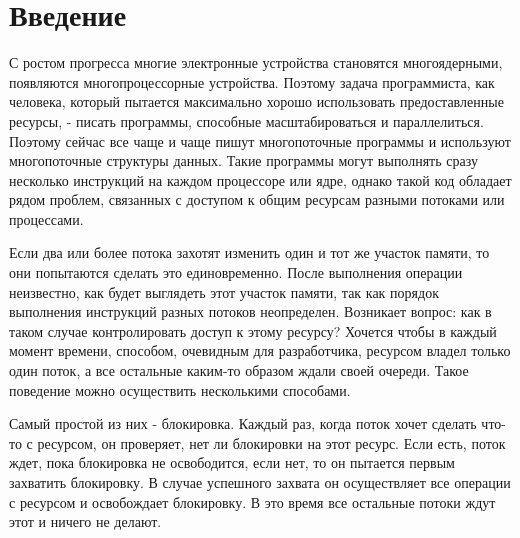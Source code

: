 \documentclass[12pt]{article}
\begin{document}
	\newpage
	
	{\pagestyle{plain}
		\tableofcontents
	}

	\newpage
	
	{\pagestyle{plain}
		
		\section{Введение}
			\par\large С ростом прогресса многие электронные устройства становятся многоядерными, появляются многопроцессорные устройства. Поэтому задача программиста, как человека, который пытается максимально хорошо использовать предоставленные ресурсы, - писать программы, способные масштабироваться и параллелиться. Поэтому сейчас все чаще и чаще пишут многопоточные программы и используют многопоточные структуры данных. Такие программы могут выполнять сразу несколько инструкций на каждом процессоре или ядре, однако такой код обладает рядом проблем, связанных с доступом к общим ресурсам разными потоками или процессами.
			\par Если два или более потока захотят изменить один и тот же участок памяти, то они попытаются сделать это единовременно. После выполнения операции неизвестно, как будет выглядеть этот участок памяти, так как порядок выполнения инструкций разных потоков неопределен. Возникает вопрос: как в таком случае контролировать доступ к этому ресурсу? Хочется чтобы в каждый момент времени, способом, очевидным для разработчика, ресурсом владел только один поток, а все остальные каким-то образом ждали своей очереди. Такое поведение можно осуществить несколькими способами. 
			\par Самый простой из них - блокировка. Каждый раз, когда поток хочет сделать что-то с ресурсом, он проверяет, нет ли блокировки на этот ресурс. Если есть, поток ждет, пока блокировка не освободится, если нет, то он пытается первым захватить блокировку. В случае успешного захвата он осуществляет все операции с ресурсом и освобождает блокировку. В это время все остальные потоки ждут этот и ничего не делают. 
}
\end{document}
